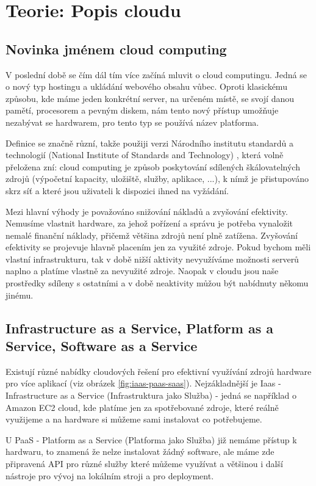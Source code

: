 \chapter{Teorie: Popis cloudu}

\section{Novinka jménem cloud computing}
V poslední době se čím dál tím více začíná mluvit o cloud computingu. Jedná se o nový typ hostingu a ukládání webového obsahu vůbec. Oproti klasickému způsobu, kde máme jeden konkrétní server, na určeném místě, se svojí danou pamětí, procesorem a pevným diskem, nám tento nový přístup umožňuje nezabývat se hardwarem, pro tento typ se používá název platforma. 

Definice se značně různí, takže použiji verzi Národního institutu standardů a technologií (National Institute of Standards and Technology) \cite{web:nist-cloud},
která volně přeložena zní: cloud computing je způsob poskytování sdílených škálovatelných zdrojů (výpočetní kapacity, uložiště, služby, aplikace, ...), k nímž je přistupováno skrz síť a které jsou uživateli k dispozici ihned na vyžádání. 

Mezi hlavní výhody je považováno snižování nákladů a zvyšování efektivity. Nemusíme vlastnit hardware, za jehož pořízení a správu je potřeba vynaložit nemalé finanční náklady, přičemž většina zdrojů není plně zatížena. Zvyšování efektivity se projevuje hlavně placením jen za využité zdroje. Pokud bychom měli vlastní infrastrukturu, tak v době nižší aktivity nevyužíváme možnosti serverů naplno a platíme vlastně za nevyužité zdroje. Naopak v cloudu jsou naše prostředky sdíleny s ostatními a v době neaktivity můžou být nabídnuty někomu jinému.

\section{Infrastructure as a Service, Platform as a Service, Software as a Service}
Existují různé nabídky cloudových řešení pro efektivní využívání zdrojů hardware pro více aplikací (viz obrázek \ref{fig:iaas-paas-saas}). Nejzákladnější je Iaas - Infrastructure as a Service (Infrastruktura jako Služba) - jedná se například o Amazon EC2 \cite{web:amazon-ec2} cloud, kde platíme jen za spotřebované zdroje, které reálně využijeme a na hardware si můžeme sami instalovat co potřebujeme. 

U PaaS - Platform as a Service  (Platforma jako Služba) již nemáme přístup k hardwaru, to znamená že nelze instalovat žádný software, ale máme zde připravená API pro různé služby které můžeme využívat a většinou i další nástroje pro vývoj na lokálním stroji a pro deployment.

